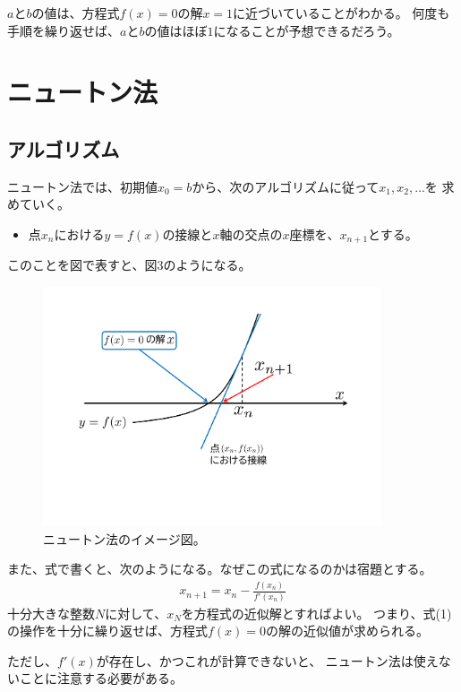 \documentclass[a4paper, platex, dvipdfmx]{jsarticle}
\begin{document}
$a$と$b$の値は、方程式$f(x)=0$の解$x=1$に近づいていることがわかる。
何度も手順を繰り返せば、$a$と$b$の値はほぼ$1$になることが予想できるだろう。

\section{ニュートン法}
\subsection{アルゴリズム}
ニュートン法では、初期値$x_0=b$から、次のアルゴリズムに従って$x_1,x_2,\ldots$を
求めていく。
\begin{itemize}
  \item 点$x_n$における$y=f(x)$の接線と$x$軸の交点の$x$座標を、$x_{n+1}$とする。
\end{itemize}
このことを図で表すと、図3のようになる。
\begin{figure}
  \centering
  \includegraphics[width=10cm]{fig/figure3.pdf}
  \caption{ニュートン法のイメージ図。}
\end{figure}
また、式で書くと、次のようになる。なぜこの式になるのかは宿題とする。
\begin{align}
  x_{n+1}=x_n-\frac{f(x_n)}{f'(x_n)}
\end{align}
十分大きな整数$N$に対して、$x_N$を方程式の近似解とすればよい。
つまり、式(1)の操作を十分に繰り返せば、方程式$f(x)=0$の解の近似値が求められる。

ただし、$f'(x)$が存在し、かつこれが計算できないと、
ニュートン法は使えないことに注意する必要がある。
\end{document}
